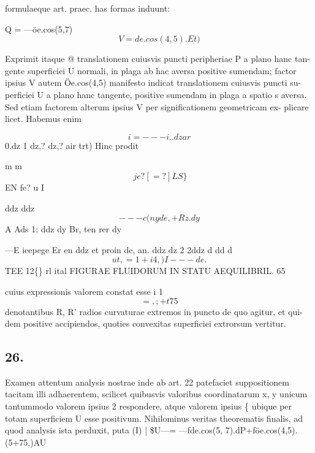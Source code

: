\documentclass[12pt,a4paper]{article}
\begin{document}
formulaeque art. praec. has formas induunt:

Q = ---öe.cos(5,7)
\[                            V=     de.cos(4,5). Et)\]

Exprimit itaque @ translationem cuiusvis puncti peripheriae P a plano hanc tan-
gente superficiei U normali, in plaga ab hac aversa positive sumendam; factor
ipsius V autem Öe.cos(4,5) manifesto indicat translationem cuiusvis puncti su-
perficiei U a plano hanc tangente, positive sumendam in plaga a spatio s aversa.
Sed etiam factorem alterum ipsius V per significationem geometricam ex-
plicare licet. Habemus enim

\[                             i=---i..dz                               ar\]
0.dz
1                  dz,?               dz,?
air                           trt)
Hinc prodit


m m
\[                                   \        je? [=?]LS\}\]
EN
fe? u
I


ddz   ddz
\[                                         ---c(ny             de ,+Rz. dy\]
A             Ads                        1:         ddz
dy          Br,                           ten      rer dy

---E ieepege Er
en ddz
et proin
de,   an.             ddz           dz 2               2ddz    d       dd   d
\[            ut,         =           1+i4,)                I--- de.\]
TEE 12\textdegree\{\} rl                 ital
FIGURAE FLUIDORUM IN STATU AEQUILIBRIL.                      65

cuius expressionis valorem constat esse
i      1
\[                                      =,;+t75\]
denotantibus   R, R' radios curvaturae extremos in puncto de quo agitur, et qui-
dem positive accipiendos,   quoties convexitas superficiei extrorsum vertitur.



\subsection*{26.}

Examen attentum analysis nostrae inde ab art. 22 patefaciet suppositionem
tacitam illi adhaerentem, scilicet quibusvis valoribus coordinatarum x, y unicum
tantummodo valorem ipsius 2 respondere, atque valorem ipsius \{ ubique per
totam superficiem U esse positivum. Nihilominus veritas theorematis finalis, ad
quod analysis ista perduxit, puta (I)                |
\$U---= ---fde.cos(5, 7).dP+föe.cos(4,5).(5+75,)AU
\end{document}
